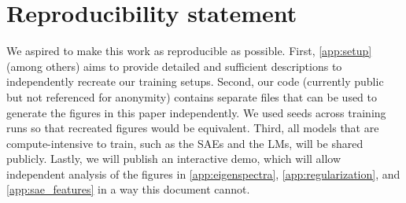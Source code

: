 \documentclass{article} %
\begin{document}
\section*{Reproducibility statement}
We aspired to make this work as reproducible as possible. First, \autoref{app:setup} (among others) aims to provide detailed and sufficient descriptions to independently recreate our training setups. Second, our code (currently public but not referenced for anonymity) contains separate files that can be used to generate the figures in this paper independently. We used seeds across training runs so that recreated figures would be equivalent. Third, all models that are compute-intensive to train, such as the SAEs and the LMs, will be shared publicly. Lastly, we will publish an interactive demo, which will allow independent analysis of the figures in \autoref{app:eigenspectra}, \autoref{app:regularization}, and \autoref{app:sae_features} in a way this document cannot.




\end{document}
